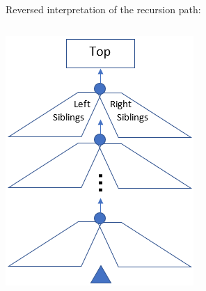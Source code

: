 \begin{frame}
Reversed interpretation of the recursion path:

\bigskip

\begin{columns}
\begin{column}{0.4\textwidth}
\centering
\includegraphics[width=\textwidth]{figure/zipper}
\end{column}


\end{columns}
\end{frame}
